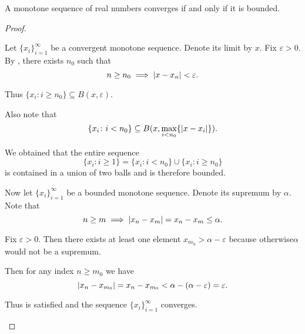 \begin{proposition}\label{thm:real_monotone_sequence_converges_iff_bounded}
  A monotone sequence of real numbers converges if and only if it is bounded.
\end{proposition}
\begin{proof}\mbox{}
  \begin{description}
    \Implies Let \( \{ x_i \}_{i=1}^\infty \) be a convergent monotone sequence. Denote its limit by \( x \). Fix \( \varepsilon > 0 \). By , there exists \( n_0 \) such that
    \begin{equation*}
      n \geq n_0 \implies \left\vert x - x_n \right\vert < \varepsilon.
    \end{equation*}

    Thus \( \{ x_i \colon i \geq n_0 \} \subseteq B(x, \varepsilon) \).

    Also note that
    \begin{equation*}
      \{ x_i \colon i < n_0 \} \subseteq B(x, \max_{i < n_0} \{ \left\vert x - x_i \right\vert \}).
    \end{equation*}

    We obtained that the entire sequence
    \begin{equation*}
      \{ x_i \colon i \geq 1 \} = \{ x_i \colon i < n_0 \} \cup \{ x_i \colon i \geq n_0 \}
    \end{equation*}
    is contained in a union of two balls and is therefore bounded.

    \ImpliedBy Now let \( \{ x_i \}_{i=1}^\infty \) be a bounded monotone sequence. Denote its supremum by \( \alpha \). Note that
    \begin{equation*}
      n \geq m \implies \left\vert x_n - x_m \right\vert = x_n - x_m \leq \alpha.
    \end{equation*}

    Fix \( \varepsilon > 0 \). Then there exists at least one element \( x_{m_0} > \alpha - \varepsilon \) because otherwise\LEM \( \alpha \) would not be a supremum.

    Then for any index \( n \geq m_0 \) we have
    \begin{equation*}
      \left\vert x_n - x_{m_0} \right\vert = x_n - x_{m_0} < \alpha - (\alpha - \varepsilon) = \varepsilon.
    \end{equation*}

    Thus  is satisfied and the sequence \( \{ x_i \}_{i=1}^\infty \) converges.
  \end{description}
\end{proof}
